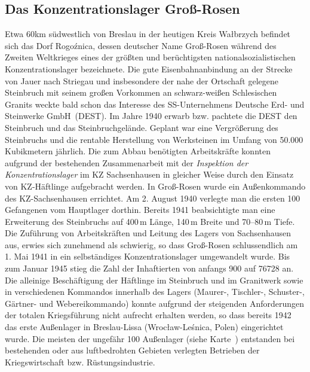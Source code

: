\begin{fshaded}\vspace{-.5cm}\subsection*{Das Konzentrationslager Groß-Rosen}
Etwa 60km südwestlich von Breslau in der heutigen Kreis Wa\l brzych befindet sich das Dorf Rogo\'znica, dessen deutscher Name Groß-Rosen  während des Zweiten Weltkrieges eines der größten und berüchtigsten nationalsozialistischen Konzentrationslager bezeichnete. Die gute Eisenbahnanbindung an der Strecke von Jauer nach Striegau und insbesondere der nahe der Ortschaft gelegene Steinbruch mit seinem großen Vorkommen an schwarz-weißen Schlesischen Granits weckte bald schon das Interesse des SS-Unternehmens \glqq Deutsche Erd- und Steinwerke GmbH\grqq~\-(DEST). Im Jahre 1940 erwarb bzw. pachtete die DEST den Steinbruch und das Steinbruchgelände. Geplant war eine Vergrößerung des Steinbruchs und die rentable Herstellung von Werksteinen im Umfang von 50.000 Kubikmetern jährlich. Die zum Abbau benötigten Arbeitskräfte konnten aufgrund der bestehenden Zusammenarbeit mit der \emph{Inspektion der Konzentrationslager} im KZ Sachsenhausen in gleicher Weise durch den Einsatz von KZ-Häftlinge aufgebracht werden. In Groß-Rosen wurde ein Außenkommando des KZ-Sachsenhausen errichtet. Am 2. August 1940 verlegte man die ersten 100 Gefangenen vom Hauptlager dorthin. Bereits 1941 beabsichtigte man eine Erweiterung des Steinbruchs auf 400\,m Länge, 140\,m Breite und 70--80\,m Tiefe. Die Zuführung von Arbeitskräften und Leitung des Lagers von Sachsenhausen aus, erwies sich zunehmend als schwierig, so dass Groß-Rosen schlussendlich am 1. Mai 1941 in ein selbständiges Konzentrationslager umgewandelt wurde. Bis zum Januar 1945 stieg die Zahl der Inhaftierten von anfangs 900 auf 76728 an. Die alleinige Beschäftigung der Häftlinge im Steinbruch und im Granitwerk sowie in verschiedenen Kommandos innerhalb des Lagers (Maurer-, Tischler-, Schuster-, Gärtner- und Webereikommando) konnte aufgrund der steigenden Anforderungen der totalen Kriegsführung nicht aufrecht erhalten werden, so dass bereits 1942 das erste Außenlager in Breslau-Lissa (Wroc\l aw-Leśnica, Polen) eingerichtet wurde. Die meisten der ungefähr 100 Außenlager (siehe Karte~) entstanden bei bestehenden oder aus luftbedrohten Gebieten verlegten Betrieben der Kriegswirtschaft bzw. Rüstungsindustrie.

\end{fshaded}
